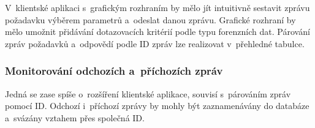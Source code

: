 V~klientské aplikaci s~grafickým rozhraním by mělo jít intuitivně sestavit zprávu požadavku výběrem parametrů a~odeslat danou zprávu. Grafické rozhraní by mělo umožnit přidávání dotazovacích kritérií podle typu forenzních dat. Párování zpráv požadavků a~odpovědí podle ID zpráv lze realizovat v~přehledné tabulce.

\subsubsection{Monitorování odchozích a~příchozích zpráv}
Jedná se zase spíše o~rozšíření klientské aplikace, souvisí s~párováním zpráv pomocí ID. Odchozí i~příchozí zprávy by mohly být zaznamenávány do databáze a~svázány vztahem přes společná ID.

